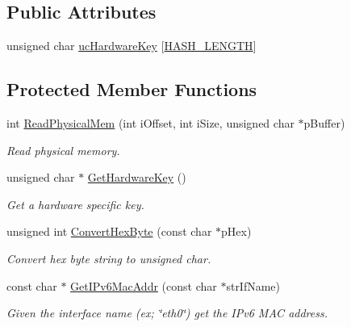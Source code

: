 \subsection*{\-Public \-Attributes}
\begin{DoxyCompactItemize}
\item 
unsigned char \hyperlink{class_check_mem_signature_afc2a181bcd1a9253d9b830371a05d5b6}{uc\-Hardware\-Key} \mbox{[}\hyperlink{_check_mem_signature_8h_a42eb19b10bf0faee9c8decb218bdeae9}{\-H\-A\-S\-H\-\_\-\-L\-E\-N\-G\-T\-H}\mbox{]}
\end{DoxyCompactItemize}
\subsection*{\-Protected \-Member \-Functions}
\begin{DoxyCompactItemize}
\item 
int \hyperlink{class_check_mem_signature_afe91f6cdc48a291269f3aceeb58d5adf}{\-Read\-Physical\-Mem} (int i\-Offset, int i\-Size, unsigned char $\ast$p\-Buffer)
\begin{DoxyCompactList}\small\item\em \-Read physical memory. \end{DoxyCompactList}\item 
unsigned char $\ast$ \hyperlink{class_check_mem_signature_a6cb439070a1f5f8810dfc70e73287a9d}{\-Get\-Hardware\-Key} ()
\begin{DoxyCompactList}\small\item\em \-Get a hardware specific key. \end{DoxyCompactList}\item 
unsigned int \hyperlink{class_check_mem_signature_a9eff44e59aa539037f2bda3962a1779a}{\-Convert\-Hex\-Byte} (const char $\ast$p\-Hex)
\begin{DoxyCompactList}\small\item\em \-Convert hex byte string to unsigned char. \end{DoxyCompactList}\item 
const char $\ast$ \hyperlink{class_check_mem_signature_aa8bcf6c0a50ca2d2852842650a4a657d}{\-Get\-I\-Pv6\-Mac\-Addr} (const char $\ast$str\-If\-Name)
\begin{DoxyCompactList}\small\item\em \-Given the interface name (ex; \char`\"{}eth0\char`\"{}) get the \-I\-Pv6 \-M\-A\-C address. \end{DoxyCompactList}\end{DoxyCompactItemize}
